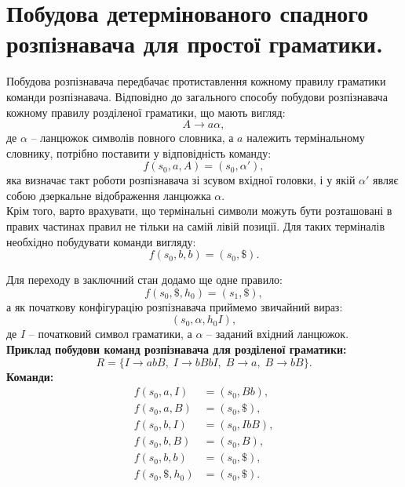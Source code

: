 \section{Побудова детермінованого спадного розпізнавача для простої граматики. }
Побудова розпізнавача передбачає протиставлення кожному правилу граматики команди розпізнавача. Відповідно до загального способу побудови розпізнавача кожному правилу розділеної граматики, що мають вигляд:
\[
A \to a \alpha,
\]
де $\alpha$ – ланцюжок символів повного словника, а $a$ належить термінальному словнику, потрібно поставити у відповідність команду:
\[
f(s_0, a, A) = (s_0, \alpha'),
\]
яка визначає такт роботи розпізнавача зі зсувом вхідної головки, і у якій $\alpha'$ являє собою дзеркальне відображення ланцюжка $\alpha$.\\

Крім того, варто врахувати, що термінальні символи можуть бути розташовані в правих частинах правил не тільки на самій лівій позиції. Для таких терміналів необхідно побудувати команди вигляду:
\[
f(s_0, b, b) = (s_0, \$).
\]

Для переходу в заключний стан додамо ще одне правило:
\[
f(s_0, \$, h_0) = (s_1, \$),
\]
а як початкову конфігурацію розпізнавача приймемо звичайний вираз:
\[
(s_0, \alpha, h_0I),
\]
де $I$ – початковий символ граматики, а $\alpha$ – заданий вхідний ланцюжок.\\

\textbf{Приклад побудови команд розпізнавача для розділеної граматики:}
\[
R = \{I \to abB, \; I \to bBbI, \; B \to a, \; B \to bB\}.
\]
\textbf{Команди:}
\begin{align*}
f(s_0, a, I) &= (s_0, Bb), \\
f(s_0, a, B) &= (s_0, \$), \\
f(s_0, b, I) &= (s_0, IbB), \\
f(s_0, b, B) &= (s_0, B), \\
f(s_0, b, b) &= (s_0, \$), \\
f(s_0, \$, h_0) &= (s_0, \$).
\end{align*}



